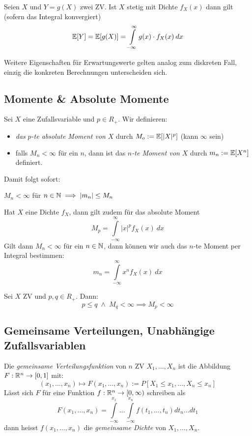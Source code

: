 \begin{satz}
Seien $X$ und $Y=g(X)$ zwei ZV. Ist $X$ stetig mit Dichte $f_X(x)$ dann gilt (sofern das Integral konvergiert)
$$ \mathbb{E}[Y] = \mathbb{E}[g(X)] = \int \limits_{-\infty}^{\infty} g(x) \cdot f_X(x) \: dx$$
\end{satz}
Weitere Eigenschaften für Erwartungswerte gelten analog zum diskreten Fall, einzig die konkreten Berechnungen unterscheiden sich.

\subsection{Momente \& Absolute Momente}
\begin{definition}
Sei $X$ eine Zufallsvariable und $p\in R_+$. Wir definieren:
\begin{itemize}
\item \textit{das} $p$\textit{-te absolute Moment von} $X$ durch $M_o := \mathbb{E}[|X|^p ]$ (kann $\infty$ sein)
\item falls $M_n < \infty$ für ein $n$, dann ist das $n$\textit{-te Moment von} $X$ durch $m_n:= \mathbb{E}[X^n]$ definiert.
\end{itemize}
\end{definition}
Damit folgt sofort:
\begin{korollar}
$M_n < \infty$ für $n\in\mathbb{N} \implies |m_n| \leq M_n$
\end{korollar}
Hat $X$ eine Dichte $f_X$, dann gilt zudem für das absolute Moment
$$ M_p = \int \limits_{-\infty}^\infty |x|^p f_X(x) \ dx$$ 
Gilt dann $M_n < \infty$ für ein $n\in\mathbb{N}$, dann können wir auch das $n$-te Moment per Integral bestimmen:
$$ m_n = \int \limits_{-\infty}^{\infty} x^n f_X(x) \ dx $$

\begin{satz}
Sei $X$ ZV und $p,q \in R_+$. Dann:
$$ p \leq q \; \land \; M_q < \infty \implies M_p < \infty$$
\end{satz}
\subsection{Gemeinsame Verteilungen, Unabhängige Zufallsvariablen}

\begin{definition}
Die \textit{gemeinsame Verteilungsfunktion} von $n$ ZV $X_1,\dots, X_n$ ist die Abbildung $F:\mathbb{R}^n \to [0,1]$ mit:
$$ (x_1,\dots, x_n) \mapsto F(x_1, \dots, x_n) := P[X_1 \leq x_1, \dots, X_n \leq x_n]$$
Lässt sich $F$ für eine Funktion $f:\mathbb{R}^n \to [0, \infty)$ schreiben als 
$$ F(x_1,\dots, x_n) = \int\limits_{-\infty}^{x_1} \dots \int \limits_{-\infty}^{x_n} f(t_1, \dots, t_n) dt_n \dots dt_1 $$
dann heisst $f(x_1,\dots, x_n)$ die \textit{gemeinsame Dichte} von $X_1, \dots, X_n$.
\end{definition}

